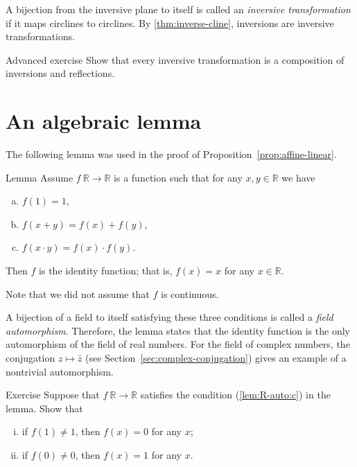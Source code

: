 A bijection from the inversive plane to itself is called an \emph{inversive transformation} if it maps circlines to circlines.
By \ref{thm:inverse-cline},  inversions are  inversive transformations.

\begin{thm}{Advanced exercise}\label{ex:inversions-inversive}
Show that every inversive transformation is a composition of inversions and reflections.
\end{thm}



\section{An algebraic lemma}

The following lemma was used in the proof of Proposition~\ref{prop:affine-linear}.

\begin{thm}{Lemma}\label{lem:R-auto}
Assume $f\:\mathbb{R}\to\mathbb{R}$ is a function such that for any $x,y\in\mathbb{R}$ we have
\begin{enumerate}[(a)]
\item\label{lem:R-auto:a} $f(1)=1$,
\item\label{lem:R-auto:b} $f(x+y)=f(x)+f(y)$,
\item\label{lem:R-auto:c} $f(x\cdot y)=f(x)\cdot f(y)$.
\end{enumerate}

Then $f$ is the identity function; that is,
$f(x)=x$ for any $x\in \mathbb{R}$.
\end{thm}

Note that we did not assume that $f$ is continuous.

A bijection of a field to itself satisfying these three conditions is called a \emph{field automorphism}.
Therefore, the lemma states that the identity function is the only automorphism of the field of real numbers.
For the field of complex numbers, the conjugation $z\mapsto\bar z$ (see Section~\ref{sec:complex-conjugation}) gives an example of a nontrivial automorphism.

\begin{thm}{Exercise}\label{ex:f(1)=1}
Suppose that $f\:\mathbb{R}\to\mathbb{R}$ satisfies the condition (\ref{lem:R-auto:c}) in the lemma.
Show that 
\begin{enumerate}[(i)]
 \item if $f(1)\ne 1$, then $f(x)=0$ for any $x$;
  \item if $f(0)\ne 0$, then $f(x)=1$ for any $x$.
\end{enumerate}
\end{thm}


